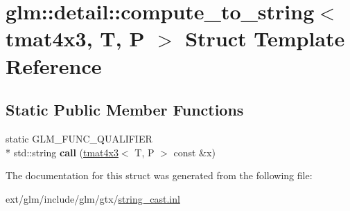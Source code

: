 \hypertarget{structglm_1_1detail_1_1compute__to__string_3_01tmat4x3_00_01_t_00_01_p_01_4}{\section{glm\-:\-:detail\-:\-:compute\-\_\-to\-\_\-string$<$ tmat4x3, T, P $>$ Struct Template Reference}
\label{structglm_1_1detail_1_1compute__to__string_3_01tmat4x3_00_01_t_00_01_p_01_4}
}
\subsection*{Static Public Member Functions}
\begin{DoxyCompactItemize}
\item 
\hypertarget{structglm_1_1detail_1_1compute__to__string_3_01tmat4x3_00_01_t_00_01_p_01_4_a03c7f8dad22b2fbd9a5f90593cffc1a1}{static G\-L\-M\-\_\-\-F\-U\-N\-C\-\_\-\-Q\-U\-A\-L\-I\-F\-I\-E\-R \\*
std\-::string {\bfseries call} (\hyperlink{structglm_1_1tmat4x3}{tmat4x3}$<$ T, P $>$ const \&x)}\label{structglm_1_1detail_1_1compute__to__string_3_01tmat4x3_00_01_t_00_01_p_01_4_a03c7f8dad22b2fbd9a5f90593cffc1a1}

\end{DoxyCompactItemize}


The documentation for this struct was generated from the following file\-:\begin{DoxyCompactItemize}
\item 
ext/glm/include/glm/gtx/\hyperlink{string__cast_8inl}{string\-\_\-cast.\-inl}\end{DoxyCompactItemize}
